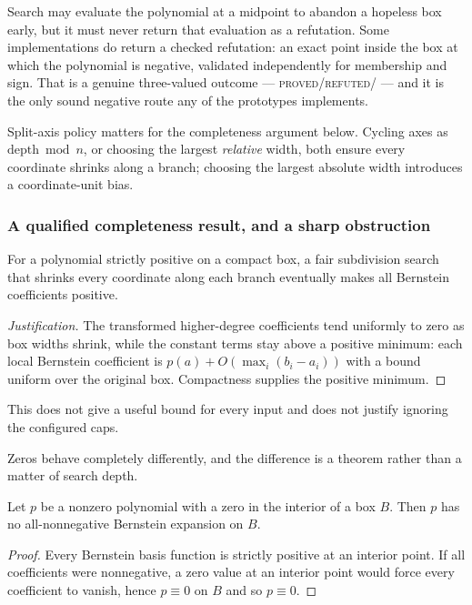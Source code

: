 Search may evaluate the polynomial at a midpoint to abandon a hopeless box
early, but it must never return that evaluation as a refutation. Some
implementations do return a checked refutation: an exact point inside the box at
which the polynomial is negative, validated independently for membership and
sign. That is a genuine three-valued outcome ---
\textsc{proved}/\textsc{refuted}/\unknown{} --- and it is the only sound negative
route any of the prototypes implements.

Split-axis policy matters for the completeness argument below. Cycling axes as
$\mathrm{depth}\bmod n$, or choosing the largest \emph{relative} width, both
ensure every coordinate shrinks along a branch; choosing the largest absolute
width introduces a coordinate-unit bias.

\subsubsection*{A qualified completeness result, and a sharp obstruction}

\begin{proposition}
\label{prop:bernstein-complete}
For a polynomial strictly positive on a compact box, a fair subdivision search
that shrinks every coordinate along each branch eventually makes all Bernstein
coefficients positive.
\end{proposition}
\begin{proof}[Justification]
The transformed higher-degree coefficients tend uniformly to zero as box widths
shrink, while the constant terms stay above a positive minimum: each local
Bernstein coefficient is $p(a)+O(\max_i(b_i-a_i))$ with a bound uniform over the
original box. Compactness supplies the positive minimum.
\end{proof}

This does not give a useful bound for every input and does not justify ignoring
the configured caps.

Zeros behave completely differently, and the difference is a theorem rather than
a matter of search depth.

\begin{theorem}
\label{thm:zero}
Let $p$ be a nonzero polynomial with a zero in the interior of a box $B$. Then
$p$ has no all-nonnegative Bernstein expansion on $B$.
\end{theorem}
\begin{proof}
Every Bernstein basis function is strictly positive at an interior point. If all
coefficients were nonnegative, a zero value at an interior point would force
every coefficient to vanish, hence $p\equiv0$ on $B$ and so $p\equiv0$.
\end{proof}

